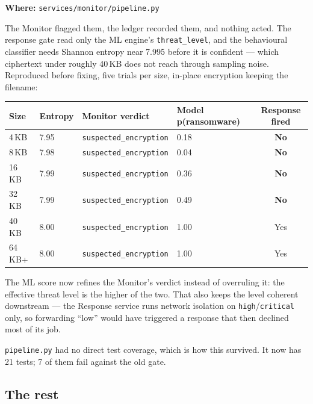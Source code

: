 \documentclass[11pt,a4paper]{article}
\begin{document}
\textbf{Where:} \texttt{services/monitor/pipeline.py}

The Monitor flagged them, the ledger recorded them, and nothing acted. The
response gate read only the ML engine's \texttt{threat\_level}, and the behavioural
classifier needs Shannon entropy near 7.995 before it is confident --- which
ciphertext under roughly 40\,KB does not reach through sampling noise. Reproduced
before fixing, five trials per size, in-place encryption keeping the filename:

\begin{center}
\begin{tabular}{@{}llllc@{}}
\toprule
\textbf{Size} & \textbf{Entropy} & \textbf{Monitor verdict} & \textbf{Model p(ransomware)} & \textbf{Response fired} \\
\midrule
4\,KB    & 7.95 & \texttt{suspected\_encryption} & 0.18 & \textbf{No} \\
8\,KB    & 7.98 & \texttt{suspected\_encryption} & 0.04 & \textbf{No} \\
16\,KB   & 7.99 & \texttt{suspected\_encryption} & 0.36 & \textbf{No} \\
32\,KB   & 7.99 & \texttt{suspected\_encryption} & 0.49 & \textbf{No} \\
40\,KB   & 8.00 & \texttt{suspected\_encryption} & 1.00 & Yes \\
64\,KB+  & 8.00 & \texttt{suspected\_encryption} & 1.00 & Yes \\
\bottomrule
\end{tabular}
\end{center}

The ML score now refines the Monitor's verdict instead of overruling it: the
effective threat level is the higher of the two. That also keeps the level
coherent downstream --- the Response service runs network isolation on
\texttt{high}/\texttt{critical} only, so forwarding ``low'' would have triggered a response that
then declined most of its job.

\texttt{pipeline.py} had no direct test coverage, which is how this survived. It now has
21 tests; 7 of them fail against the old gate.

\subsection{The rest}
\end{document}
